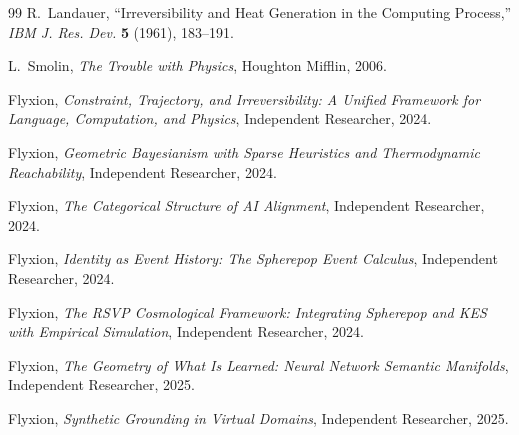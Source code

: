 \documentclass[12pt, oneside]{amsart}
\theoremstyle{plain}
\theoremstyle{definition}
\theoremstyle{remark}
\begin{document}
\begin{thebibliography}{99}
R.~Landauer,
\newblock ``Irreversibility and Heat Generation in the Computing Process,''
\newblock \textit{IBM J. Res. Dev.} \textbf{5} (1961), 183--191.


L.~Smolin,
\newblock \textit{The Trouble with Physics},
\newblock Houghton Mifflin, 2006.


Flyxion,
\newblock \textit{Constraint, Trajectory, and Irreversibility: A Unified Framework for Language, Computation, and Physics},
\newblock Independent Researcher, 2024.

Flyxion,
\newblock \textit{Geometric Bayesianism with Sparse Heuristics and Thermodynamic Reachability},
\newblock Independent Researcher, 2024.

Flyxion,
\newblock \textit{The Categorical Structure of AI Alignment},
\newblock Independent Researcher, 2024.

Flyxion,
\newblock \textit{Identity as Event History: The Spherepop Event Calculus},
\newblock Independent Researcher, 2024.

Flyxion,
\newblock \textit{The RSVP Cosmological Framework: Integrating Spherepop and KES with Empirical Simulation},
\newblock Independent Researcher, 2024.

Flyxion,
\newblock \textit{The Geometry of What Is Learned: Neural Network Semantic Manifolds},
\newblock Independent Researcher, 2025.

Flyxion,
\newblock \textit{Synthetic Grounding in Virtual Domains},
\newblock Independent Researcher, 2025.

\end{thebibliography}
\end{document}
